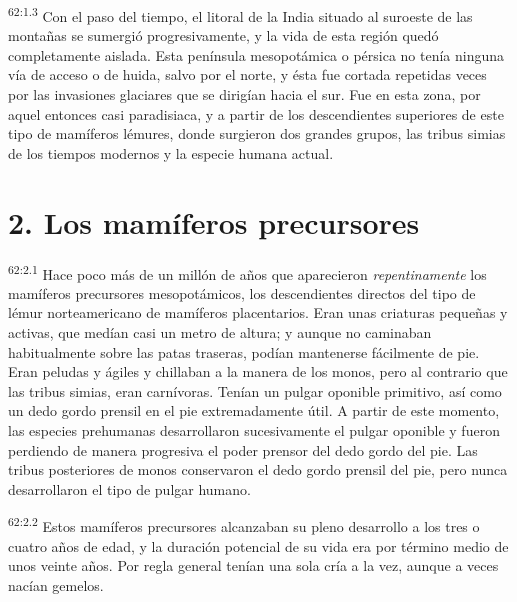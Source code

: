 \par
\textsuperscript{62:1.3} Con el paso del tiempo, el litoral de la India situado al suroeste de las montañas se sumergió progresivamente, y la vida de esta región quedó completamente aislada. Esta península mesopotámica o pérsica no tenía ninguna vía de acceso o de huida, salvo por el norte, y ésta fue cortada repetidas veces por las invasiones glaciares que se dirigían hacia el sur. Fue en esta zona, por aquel entonces casi paradisiaca, y a partir de los descendientes superiores de este tipo de mamíferos lémures, donde surgieron dos grandes grupos, las tribus simias de los tiempos modernos y la especie humana actual.

\section*{2. Los mamíferos precursores}
\par
\textsuperscript{62:2.1} Hace poco más de un millón de años que aparecieron \textit{repentinamente} los mamíferos precursores mesopotámicos, los descendientes directos del tipo de lémur norteamericano de mamíferos placentarios. Eran unas criaturas pequeñas y activas, que medían casi un metro de altura; y aunque no caminaban habitualmente sobre las patas traseras, podían mantenerse fácilmente de pie. Eran peludas y ágiles y chillaban a la manera de los monos, pero al contrario que las tribus simias, eran carnívoras. Tenían un pulgar oponible primitivo, así como un dedo gordo prensil en el pie extremadamente útil. A partir de este momento, las especies prehumanas desarrollaron sucesivamente el pulgar oponible y fueron perdiendo de manera progresiva el poder prensor del dedo gordo del pie. Las tribus posteriores de monos conservaron el dedo gordo prensil del pie, pero nunca desarrollaron el tipo de pulgar humano.

\par
\textsuperscript{62:2.2} Estos mamíferos precursores alcanzaban su pleno desarrollo a los tres o cuatro años de edad, y la duración potencial de su vida era por término medio de unos veinte años. Por regla general tenían una sola cría a la vez, aunque a veces nacían gemelos.

